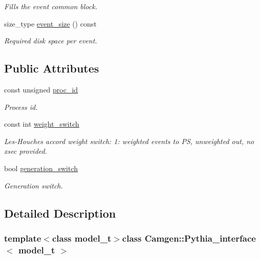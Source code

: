 \begin{DoxyCompactItemize}
\begin{DoxyCompactList}\small\item\em Fills the event common block. \end{DoxyCompactList}\item 
\hypertarget{a00459_ae0a78d3cd646f974f16f1aaae74017d4}{}size\+\_\+type \hyperlink{a00459_ae0a78d3cd646f974f16f1aaae74017d4}{event\+\_\+size} () const \label{a00459_ae0a78d3cd646f974f16f1aaae74017d4}

\begin{DoxyCompactList}\small\item\em Required disk space per event. \end{DoxyCompactList}\end{DoxyCompactItemize}
\subsection*{Public Attributes}
\begin{DoxyCompactItemize}
\item 
\hypertarget{a00459_a92336d3949758f6ebb7b07c44949a075}{}const unsigned \hyperlink{a00459_a92336d3949758f6ebb7b07c44949a075}{proc\+\_\+id}\label{a00459_a92336d3949758f6ebb7b07c44949a075}

\begin{DoxyCompactList}\small\item\em Process id. \end{DoxyCompactList}\item 
const int \hyperlink{a00459_a75fd3fbc4856898df3bcf66530af81e0}{weight\+\_\+switch}
\begin{DoxyCompactList}\small\item\em Les-\/\+Houches accord weight switch\+: 1\+: weighted events to P\+S, unweighted out, no xsec provided. \end{DoxyCompactList}\item 
bool \hyperlink{a00459_a5ecb4d493254caf2ae844b3b6a982671}{generation\+\_\+switch}
\begin{DoxyCompactList}\small\item\em Generation switch. \end{DoxyCompactList}\end{DoxyCompactItemize}


\subsection{Detailed Description}
\subsubsection*{template$<$class model\+\_\+t$>$class Camgen\+::\+Pythia\+\_\+interface$<$ model\+\_\+t $>$}


